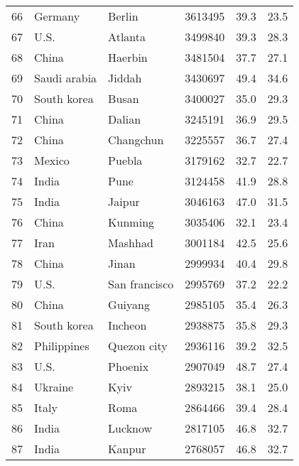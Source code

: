 \begin{center}
\begin{longtable}{clllcc}
  66 &             Germany &          Berlin &    3613495 &     39.3 &     23.5 \\
  67 &                U.S. &         Atlanta &    3499840 &     39.3 &     28.3 \\
  68 &               China &         Haerbin &    3481504 &     37.7 &     27.1 \\
  69 &        Saudi arabia &          Jiddah &    3430697 &     49.4 &     34.6 \\
  70 &         South korea &           Busan &    3400027 &     35.0 &     29.3 \\
  71 &               China &          Dalian &    3245191 &     36.9 &     29.5 \\
  72 &               China &       Changchun &    3225557 &     36.7 &     27.4 \\
  73 &              Mexico &          Puebla &    3179162 &     32.7 &     22.7 \\
  74 &               India &            Pune &    3124458 &     41.9 &     28.8 \\
  75 &               India &          Jaipur &    3046163 &     47.0 &     31.5 \\
  76 &               China &         Kunming &    3035406 &     32.1 &     23.4 \\
  77 &                Iran &         Mashhad &    3001184 &     42.5 &     25.6 \\
  78 &               China &           Jinan &    2999934 &     40.4 &     29.8 \\
  79 &                U.S. &   San francisco &    2995769 &     37.2 &     22.2 \\
  80 &               China &         Guiyang &    2985105 &     35.4 &     26.3 \\
  81 &         South korea &         Incheon &    2938875 &     35.8 &     29.3 \\
  82 &         Philippines &     Quezon city &    2936116 &     39.2 &     32.5 \\
  83 &                U.S. &         Phoenix &    2907049 &     48.7 &     27.4 \\
  84 &             Ukraine &            Kyiv &    2893215 &     38.1 &     25.0 \\
  85 &               Italy &            Roma &    2864466 &     39.4 &     28.4 \\
  86 &               India &         Lucknow &    2817105 &     46.8 &     32.7 \\
  87 &               India &          Kanpur &    2768057 &     46.8 &     32.7 \\

\end{longtable}
\end{center}
